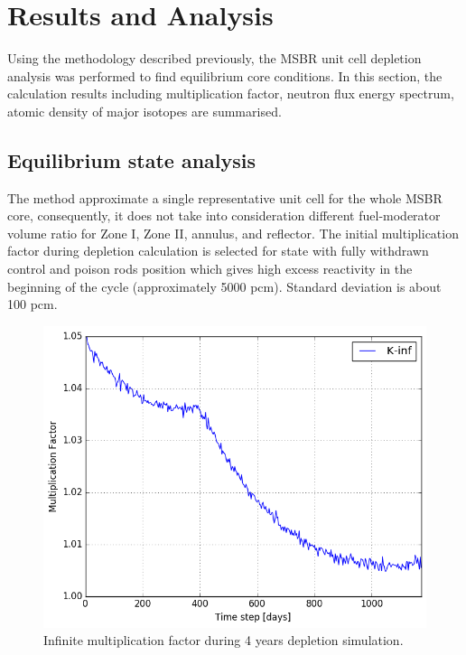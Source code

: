 \documentclass{anstrans}
\begin{document}
\section{Results and Analysis}

Using the methodology described previously, the \gls{MSBR} unit cell depletion 
analysis was performed to find equilibrium core conditions. In this section, 
the calculation results including multiplication factor, neutron flux energy 
spectrum, atomic density of major isotopes are summarised.

\subsection{Equilibrium state analysis}

The method approximate a single representative unit cell for the whole 
\gls{MSBR} core, consequently, it does not take into consideration different 
fuel-moderator volume ratio for Zone I, Zone II, annulus, and reflector. The 
initial multiplication factor during depletion calculation is selected for 
state with fully withdrawn control and poison rods position which gives high 
excess reactivity in the beginning of the cycle (approximately 5000 pcm). 
Standard deviation is about 100 pcm.

\begin{figure}[htbp!] %
        \centering
        \includegraphics[width=1.03\linewidth]{keff.png}
        \caption{Infinite multiplication factor during 4 years depletion 
        simulation.}
        \label{fig:keff}
\end{figure}
\end{document}
